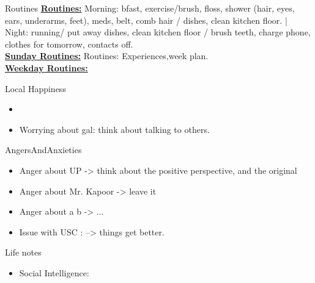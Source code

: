 \begin{columns}
    \begin{column}{0.20\linewidth}
      \begin{block}{Routines}
        { \tiny \underline{\bf Routines:} Morning: bfast, exercise/brush,
          floss, shower (hair, eyes, ears, underarms, feet), meds, belt,
          comb hair / dishes, clean kitchen floor. |  Night: running/ put
          away dishes, clean kitchen floor / brush teeth, charge phone,
          clothes for tomorrow, contacts off.}\\
        {\tiny \underline{\bf Sunday Routines:} Routines:
          Experiences,week plan.}\\ 
        {\tiny \underline{\bf Weekday Routines:}}\\
      \end{block} 
      \begin{block}{Local Happiness}
        \begin{itemize} 
          \tiny \item \tiny
        \item \tiny Worrying about gal: think about talking to others.
        \end{itemize} 
      \end{block}
      \begin{block}{AngersAndAnxieties}
        \begin{itemize}
          \tiny \item \tiny Anger about UP -> think about the positive
          perspective, and the original
        \item \tiny Anger about Mr. Kapoor ->  leave it
        \item \tiny Anger about a b  -> ...
        \item \tiny Issue with USC : --> things get better. 
        \end{itemize}
      \end{block}
      \begin{block}{Life notes}
        \begin{itemize}
          \tiny \item \tiny Social Intelligence: 
        \end{itemize}
      \end{block}


\end{column}
\end{columns}

